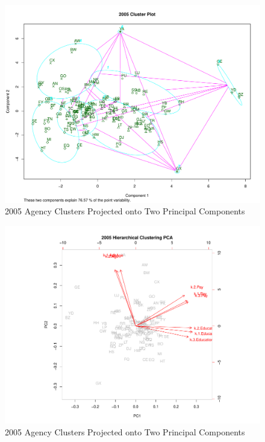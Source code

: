 \documentclass{article}
\begin{document}
    \begin{center}
        \begin{figure}
            \includegraphics[scale=0.4]{./images/2005-cluster-plot.pdf}
            \caption{2005 Agency Clusters Projected onto Two Principal Components}
            \label{fig:5}
        \end{figure}
    \end{center}

    \begin{center}
        \begin{figure}
            \includegraphics[scale=0.4]{./images/2005-pca.pdf}
            \caption{2005 Agency Clusters Projected onto Two Principal Components}
            \label{fig:6}
        \end{figure}
    \end{center}
\end{document}
